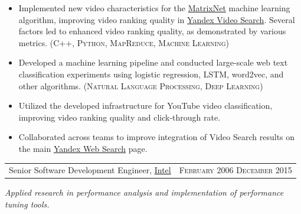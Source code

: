 \documentclass{article}
\makeatletter
\newcommand{\whatwherewhen}[3]{
\noindent\begin{tabular*}{\columnwidth}{@{}@{\extracolsep{\fill}}lr@{}}
#1, #2 & \textsc{#3}
\end{tabular*}}
\newcommand{\smallvskip}{\vskip2mm}
\makeatother
\begin{document}
\begin{itemize}

\item  Implemented new video characteristics for the \href{https://yandex.com/company/technologies/matrixnet/}{MatrixNet} machine learning algorithm, improving video ranking quality in \href{https://yandex.com/video/}{Yandex Video Search}. Several factors led to enhanced video ranking quality, as demonstrated by various metrics. (\textsc{C++}, \textsc{Python}, \textsc{MapReduce}, \textsc{Machine Learning})

\item Developed a machine learning pipeline and conducted large-scale web text classification experiments using logistic regression, LSTM, word2vec, and other algorithms. (\textsc{Natural Language Processing}, \textsc{Deep Learning})

\item Utilized the developed infrastructure for YouTube video classification, improving video ranking quality and click-through rate.

\item Collaborated across teams to improve integration of Video Search results on the main \href{https://yandex.com/}{Yandex Web Search} page.

\end{itemize}


\smallvskip
\whatwherewhen{Senior Software Development Engineer}{\href{https://intel.com}{Intel}}{February 2006 \textendash{} December 2015}

\textit{Applied research in performance analysis and implementation of performance tuning tools.}
\end{document}
